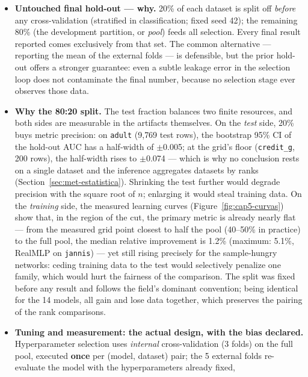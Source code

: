 \begin{itemize}
  \item \textbf{Untouched final hold-out --- why.} 20\% of each
    dataset is split off \emph{before} any cross-validation
    (stratified in classification; fixed seed 42); the remaining
    80\% (the development partition, or \emph{pool}) feeds all
    selection. Every final
    result reported comes exclusively from that set. The common
    alternative --- reporting the mean of the external folds --- is
    defensible, but the prior hold-out offers a stronger guarantee:
    even a subtle leakage error in the selection loop does not
    contaminate the final number, because no selection stage ever
    observes those data.
  \item \textbf{Why the 80:20 split.} The test fraction balances two
    finite resources, and both sides are measurable in the artifacts
    themselves. On the \emph{test} side, 20\% buys metric precision:
    on \texttt{adult} (9{,}769 test rows), the bootstrap 95\% CI of
    the hold-out AUC has a half-width of $\pm$0.005; at the grid's
    floor (\texttt{credit\_g}, 200 rows), the half-width rises to
    $\pm$0.074 --- which is why no conclusion rests on a single
    dataset and the inference aggregates datasets by ranks
    (Section~\ref{sec:met-estatistica}). Shrinking the test further
    would degrade precision with the square root of $n$; enlarging
    it would steal training data. On the \emph{training} side, the
    measured learning curves (Figure~\ref{fig:cap5-curvas}) show
    that, in the region of the cut, the primary metric is already
    nearly flat --- from the measured grid point closest to half the
    pool (40--50\% in practice) to the full pool, the median
    relative improvement is 1.2\% (maximum: 5.1\%, RealMLP on
    \texttt{jannis}) --- yet still rising precisely for the
    sample-hungry networks: ceding training data to the test would
    selectively penalize one family, which would hurt the fairness
    of the comparison. The split was fixed before any result and
    follows the field's dominant convention; being identical for the
    14 models, all gain and lose data together, which preserves the
    pairing of the rank comparisons.
  \item \textbf{Tuning and measurement: the actual design, with the
    bias declared.} Hyperparameter selection uses \emph{internal}
    cross-validation (3 folds) on the full pool, executed
    \textbf{once} per (model, dataset) pair; the 5 external folds
    re-evaluate the model with the hyperparameters already fixed,

\end{itemize}
